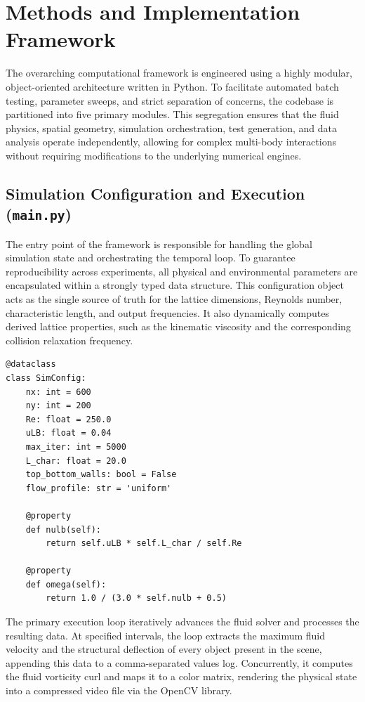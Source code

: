 \documentclass[11pt,a4paper]{article}
\begin{document}
\section{Methods and Implementation Framework}

The overarching computational framework is engineered using a highly modular, object-oriented architecture written in Python. To facilitate automated batch testing, parameter sweeps, and strict separation of concerns, the codebase is partitioned into five primary modules. This segregation ensures that the fluid physics, spatial geometry, simulation orchestration, test generation, and data analysis operate independently, allowing for complex multi-body interactions without requiring modifications to the underlying numerical engines.

\subsection{Simulation Configuration and Execution (\texttt{main.py})}
The entry point of the framework is responsible for handling the global simulation state and orchestrating the temporal loop. To guarantee reproducibility across experiments, all physical and environmental parameters are encapsulated within a strongly typed data structure. This configuration object acts as the single source of truth for the lattice dimensions, Reynolds number, characteristic length, and output frequencies. It also dynamically computes derived lattice properties, such as the kinematic viscosity and the corresponding collision relaxation frequency.

\begin{lstlisting}[style=pystyle]
@dataclass
class SimConfig:
    nx: int = 600
    ny: int = 200
    Re: float = 250.0
    uLB: float = 0.04
    max_iter: int = 5000
    L_char: float = 20.0  
    top_bottom_walls: bool = False
    flow_profile: str = 'uniform'

    @property
    def nulb(self):
        return self.uLB * self.L_char / self.Re
    
    @property
    def omega(self):
        return 1.0 / (3.0 * self.nulb + 0.5)
\end{lstlisting}

The primary execution loop iteratively advances the fluid solver and processes the resulting data. At specified intervals, the loop extracts the maximum fluid velocity and the structural deflection of every object present in the scene, appending this data to a comma-separated values log. Concurrently, it computes the fluid vorticity curl and maps it to a color matrix, rendering the physical state into a compressed video file via the OpenCV library.
\end{document}
